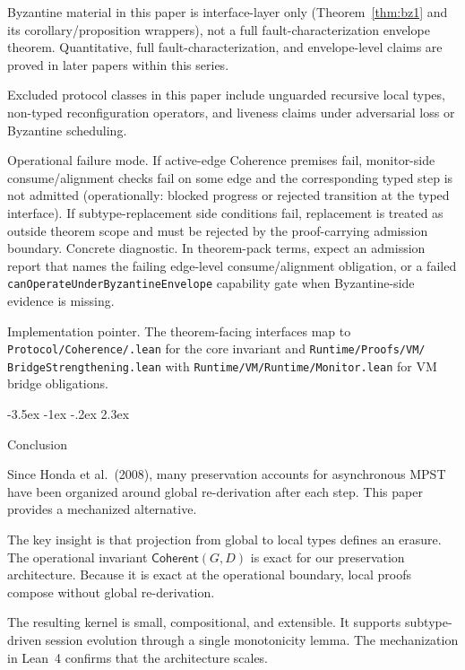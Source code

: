 \documentclass[a4paper,10pt,twocolumn,english]{article}
\makeatletter
\renewcommand{\section}{\@startsection{section}{1}{\z@}%
  {-3.5ex \@plus -1ex \@minus -.2ex}%
  {2.3ex}%
  {\raggedright\normalfont\large\bfseries}}
\numberwithin{equation}{section}
\theoremstyle{paperdef}
\theoremstyle{paperplain}
\theoremstyle{paperdef}
\theoremstyle{paperremark}
\newcommand{\Coherent}{\ensuremath{\mathsf{Coherent}}}
\makeatother
\begin{document}
Byzantine material in this paper is interface-layer only (Theorem~\ref{thm:bz1} and its corollary/proposition wrappers), not a full fault-characterization envelope theorem.
Quantitative, full fault-characterization, and envelope-level claims are proved in later papers within this series.

Excluded protocol classes in this paper include unguarded recursive local types,
non-typed reconfiguration operators, and liveness claims under adversarial loss
or Byzantine scheduling.

Operational failure mode. If active-edge Coherence premises fail, monitor-side
consume/alignment checks fail on some edge and the corresponding typed step is
not admitted (operationally: blocked progress or rejected transition at the
typed interface). If subtype-replacement side conditions fail, replacement is
treated as outside theorem scope and must be rejected by the proof-carrying
admission boundary.
Concrete diagnostic. In theorem-pack terms, expect an admission report that
names the failing edge-level consume/alignment obligation, or a failed
\texttt{canOperateUnderByzantineEnvelope} capability gate when Byzantine-side
evidence is missing.

Implementation pointer. The theorem-facing interfaces map to
\texttt{Protocol/\allowbreak Coherence/\allowbreak *.lean} for the core
invariant and \texttt{Runtime/\allowbreak Proofs/\allowbreak VM/\allowbreak
	BridgeStrengthening.lean} with
\texttt{Runtime/\allowbreak VM/\allowbreak Runtime/\allowbreak Monitor.lean}
for VM bridge obligations.

\section{Conclusion}
\label{sec:conclusion}

Since Honda et al.\ (2008), many preservation accounts for asynchronous MPST have been organized around global re-derivation after each step. This paper provides a mechanized alternative.

The key insight is that projection from global to local types defines an erasure. The operational invariant $\Coherent(G,D)$ is exact for our preservation architecture. Because it is exact at the operational boundary, local proofs compose without global re-derivation.

The resulting kernel is small, compositional, and extensible. It supports subtype-driven session evolution through a single monotonicity lemma. The mechanization in Lean~4 confirms that the architecture scales.
\end{document}
